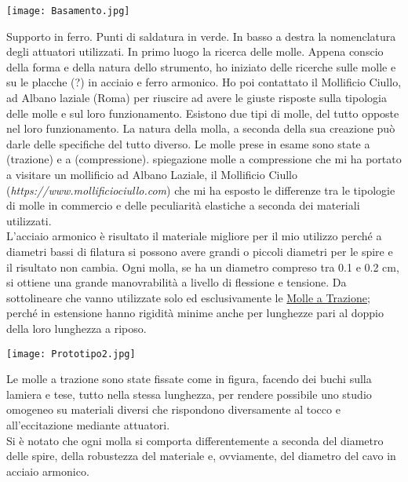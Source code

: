 \begin{center}
\begin{minipage}[c]{1.\textwidth}
\texttt{[image: Basamento.jpg]}
\end{minipage}
\end{center}

Supporto in ferro. Punti di saldatura in verde. In basso a destra la nomenclatura degli attuatori utilizzati.
In primo luogo la ricerca delle molle. Appena conscio della forma e della natura dello strumento, ho iniziato delle ricerche sulle molle e su le placche (?) in acciaio e ferro armonico. Ho poi contattato il Mollificio Ciullo, ad Albano laziale (Roma) per riuscire ad avere le giuste risposte sulla tipologia delle molle e sul loro funzionamento. Esistono due tipi di molle, del tutto opposte nel loro funzionamento. La natura della molla, a seconda della sua creazione può darle delle specifiche del tutto diverso. Le molle prese in esame sono state a (trazione) e a (compressione). 
spiegazione molle a compressione che mi ha portato a visitare un mollificio ad Albano Laziale, il Mollificio Ciullo (\textit{https://www.mollificiociullo.com}) che mi ha esposto le differenze tra le tipologie di molle in commercio e delle peculiarità elastiche a seconda dei materiali utilizzati. \\
L'acciaio armonico è risultato il materiale migliore per il mio utilizzo perché a diametri bassi di filatura si possono avere grandi o piccoli diametri per le spire e il risultato non cambia. Ogni molla, se ha un diametro compreso tra 0.1 e 0.2 cm, si ottiene una grande manovrabilità a livello di flessione e tensione. Da sottolineare che vanno utilizzate solo ed esclusivamente le \underline {Molle a Trazione}; perché in estensione hanno rigidità minime anche per lunghezze pari al doppio della loro lunghezza a riposo.
\\
\begin{center}
\begin{minipage}[c]{.7\textwidth}
\texttt{[image: Prototipo2.jpg]}
\end{minipage}
\end{center}
Le molle a trazione sono state fissate come in figura, facendo dei buchi sulla lamiera e tese, tutto nella stessa lunghezza, per rendere possibile uno studio omogeneo su materiali diversi che rispondono diversamente al tocco e all'eccitazione mediante attuatori.\\
Si è notato che ogni molla si comporta differentemente a seconda del diametro delle spire, della robustezza del materiale e, ovviamente, del diametro del cavo in acciaio armonico.

